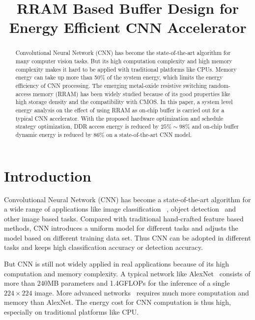 \documentclass[10pt, conference]{IEEEtran}
\begin{document}
    
    \title{\Large\textbf{RRAM Based Buffer Design for Energy Efficient CNN Accelerator}}
    
    \author{
    }
    
    \maketitle
    
    \begin{abstract}
    
    Convolutional Neural Network (CNN) has become the state-of-the-art algorithm for many computer vision tasks. But its high computation complexity and high memory complexity makes it hard to be applied with traditional platforms like CPUs. Memory energy can take up more than 50\% of the system energy, which limits the energy efficiency of CNN processing. The emerging metal-oxide resistive switching random-access memory (RRAM) has been widely studied because of its good properties like high storage density and the compatibility with CMOS. In this paper, a system level energy analysis on the effect of using RRAM as on-chip buffer is carried out for a typical CNN accelerator. With the proposed hardware optimization and schedule strategy optimization, DDR access energy is reduced by $25\%\sim 98\%$ and on-chip buffer dynamic energy is reduced by $86\%$ on a state-of-the-art CNN model.
    
    \end{abstract}
    
    
    \section{Introduction}
    
    Convolutional Neural Network (CNN) has become a state-of-the-art algorithm for a wide range of applications like image classification~\cite{simonyan2014very}\cite{he2015deep} , object detection~\cite{redmon2015you} and other image based tasks. Compared with traditional hand-crafted feature based methods, CNN introduces a uniform model for different tasks and adjusts the model based on different training data set. Thus CNN can be adopted in different tasks and keeps high classification accuracy or detection accuracy.
    
    But CNN is still not widely applied in real applications because of its high computation and memory complexity. A typical network like AlexNet~\cite{krizhevsky2012imagenet} consists of more than 240MB parameters and 1.4GFLOPs for the inference of a single $224\times 224$ image. More advanced networks~\cite{simonyan2014very}\cite{he2015deep} requires much more computation and memory than AlexNet. The energy cost for CNN computation is thus high, especially on traditional platforms like CPU.
    
\end{document}
